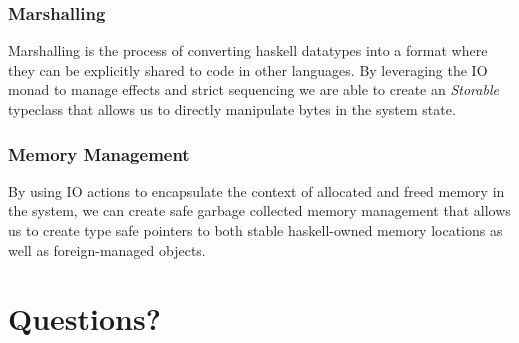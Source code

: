 \documentclass{beamer}
\begin{document}
\begin{frame}
  \frametitle{Marshalling}
  Marshalling is the process of converting haskell datatypes into a
  format where they can be explicitly shared to code in other
  languages.  By leveraging the IO monad to manage effects and strict
  sequencing we are able to create an \emph{Storable} typeclass that
  allows us to directly manipulate bytes in the system state.
\end{frame}

\begin{frame}
  \frametitle{Memory Management}
  By using IO actions to encapsulate the context of allocated and
  freed memory in the system, we can create safe garbage collected
  memory management that allows us to create type safe pointers to
  both stable haskell-owned memory locations as well as
  foreign-managed objects.
\end{frame}
\section{Questions?}
\end{document}
